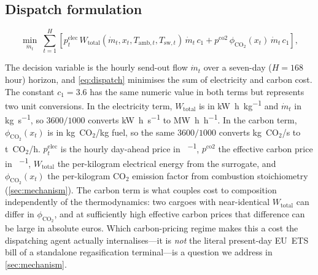 \documentclass[11pt]{article}
\begin{document}
\subsection{Dispatch formulation}
\begin{equation}
  \min_{\dot m_t} \; \sum_{t=1}^{H} \left[
      p_t^{\text{elec}} \, W_{\text{total}}(\dot m_t, x_t, T_{\text{amb},t}, T_{\text{sw},t}) \, \dot m_t \, c_1
    + p^{\text{co2}} \, \phi_{\text{CO}_2}(x_t) \, \dot m_t \, c_1 \right],
  \label{eq:dispatch}
\end{equation}
%

The decision variable is the hourly send-out flow $\dot m_t$ over a
seven-day ($H=168$ hour) horizon, and \cref{eq:dispatch} minimises the sum
of electricity and carbon cost. The constant $c_1=3.6$ has the same numeric
value in both terms but represents two unit conversions. In the electricity
term, $W_{\text{total}}$ is in \si{\kilo\watt\hour\per\kilo\gram} and
$\dot m_t$ in \si{\kilo\gram\per\second}, so $3600/1000$ converts
\si{\kilo\watt\hour\per\second} to \si{\mega\watt\hour\per\hour}. In the
carbon term, $\phi_{\text{CO}_2}(x_t)$ is in kg~CO$_2$/kg fuel, so the same
$3600/1000$ converts kg~CO$_2$/s to t~CO$_2$/h. $p^{\text{elec}}_t$ is the
hourly day-ahead price in \si{\EUR\per\MWh}, $p^{\text{co2}}$ the effective
carbon price in \si{\EUR\per\tCOtwo}, $W_{\text{total}}$ the per-kilogram
electrical energy from the surrogate, and $\phi_{\text{CO}_2}(x_t)$ the
per-kilogram CO$_2$ emission factor from combustion stoichiometry
(\cref{sec:mechanism}). The carbon term
is what couples cost to composition independently of the thermodynamics: two
cargoes with near-identical $W_{\text{total}}$ can differ in
$\phi_{\text{CO}_2}$, and at sufficiently high effective carbon prices that
difference can be large in absolute euros. Which carbon-pricing regime makes this a cost the dispatching
agent actually internalises---it is \emph{not} the literal present-day EU~ETS
bill of a standalone regasification terminal---is a question we address in
\cref{sec:mechanism}.
\end{document}
